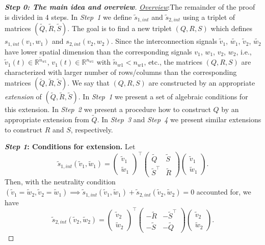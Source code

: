 \documentclass[11pt,a4paper,oneside,DIV=12,headings=small]{scrartcl}
\newcommand{\Rset}{\mathbb{R}}
\theoremstyle{plain}
\begin{document}
\begin{proof}[\textbf{Step 0: \textit{The main idea and overview}}]
\underline{\emph{Overview}}:The remainder of the proof is divided in 4 steps. In \emph{Step~1} we define $\tilde{s}_{1,int}$ and $\tilde{s}_{2,int}$ using a triplet of matrices $(\tilde{Q},\tilde{R},\tilde{S})$. The goal is to find a new triplet $(Q,R,S)$ which defines $s_{1,int}(v_1,w_1)$ and $s_{2,int}(v_2,w_2)$. Since the interconnection signals $\tilde{v}_1$, $\tilde{w_1}$, $\tilde{v}_2$, $\tilde{w_2}$ have lower spatial dimension than the corresponding signals $v_1$, $w_1$, $v_2$, $w_2$, i.e., $\tilde{v}_1(t)\in \Rset^{\tilde{n}_{w1}}$, $v_1(t)\in \Rset^{n_{w1}}$ with $\tilde{n}_{w1}<n_{w1}$, etc., the matrices $(Q,R,S)$ are characterized with larger number of rows/columns than the corresponding matrices $(\tilde{Q},\tilde{R},\tilde{S})$. We say that $(Q,R,S)$ are constructed by an appropriate \emph{extension} of $(\tilde{Q},\tilde{R},\tilde{S})$. In \emph{Step~1} we present a set of algebraic conditions for this extension. In \emph{Step~2} we present a procedure how to construct $Q$ by an appropriate extension from $\tilde{Q}$. In \emph{Step~3} and \emph{Step~4} we present similar extensions to construct $R$ and $S$, respectively.     

\medskip

\textbf{\emph{Step 1}: Conditions for extension.} \newline
Let 
\begin{equation}
\label{s1int}
\tilde{s}_{1,int}(\tilde{v}_1,\tilde{w}_1)=\begin{pmatrix} \tilde{v}_1 \\ \tilde{w}_1 \end{pmatrix}^\top \begin{pmatrix} \tilde{Q} & \tilde{S} \\ \tilde{S}^\top & \tilde{R} \end{pmatrix}\begin{pmatrix} \tilde{v}_1 \\ \tilde{w}_1 \end{pmatrix}. 
\end{equation}
Then, with the neutrality condition $(\tilde{v}_1=\tilde{w}_2, \tilde{v}_2=\tilde{w}_1) \implies \tilde{s}_{1,int}(\tilde{v}_1,\tilde{w}_1)+\tilde{s}_{2,int}(\tilde{v}_2,\tilde{w}_2)=0$ accounted for, we have 
\begin{equation}
\label{s2int}
\tilde{s}_{2,int}(\tilde{v}_2,\tilde{w}_2)=\begin{pmatrix} \tilde{v}_2 \\ \tilde{w}_2 \end{pmatrix}^\top \begin{pmatrix} -\tilde{R} & -\tilde{S}^\top \\ -\tilde{S} & -\tilde{Q} \end{pmatrix}\begin{pmatrix} \tilde{v}_2 \\ \tilde{w}_2 \end{pmatrix}.
\end{equation} 


\end{proof}
\end{document}
